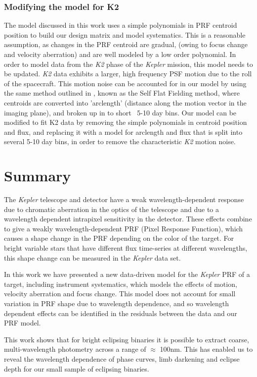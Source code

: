 \documentclass[iop]{emulateapj}
\newcommand{\kepler}{\emph{Kepler}\xspace}
\newcommand{\ktwo}{\emph{K2}\xspace}
\begin{document}
\subsubsection{Modifying the model for K2}
\label{sec:ktwo}
The model discussed in this work uses a simple polynomials in PRF centroid position to build our design matrix and model systematics. This is a reasonable assumption, as changes in the PRF centroid are gradual, (owing to focus change and velocity aberration) and are well modeled by a low order polynomial. In order to model data from the \ktwo phase of the \kepler mission, this model needs to be updated. \ktwo data exhibits a larger, high frequency PSF motion due to the roll of the spacecraft. This motion noise can be accounted for in our model by using the same method outlined in \cite{Vanderburg2014}, known as the Self Flat Fielding method, where centroids are converted into 'arclength' (distance along the motion vector in the imaging plane), and broken up in to short ~5-10 day bins. Our model can be modified to fit K2 data by removing the simple polynomials in centroid position and flux, and replacing it with a model for arclength and flux that is split into several 5-10 day bins, in order to remove the characteristic \ktwo motion noise.

\section{Summary}

The \kepler telescope and detector have a weak wavelength-dependent response due to chromatic aberration in the optics of the telescope and due to a wavelength dependent intrapixel sensitivity in the detector. These effects combine to give a weakly wavelength-dependent PRF (Pixel Response Function), which causes a shape change in the PRF depending on the color of the target. For bright variable stars that have different flux time-series at different wavelengths, this shape change can be measured in the \kepler data set.

In this work we have presented a new data-driven model for the \kepler PRF of a target, including instrument systematics, which models the effects of motion, velocity aberration and focus change. This model does not account for small variation in PRF shape due to wavelength dependence, and so wavelength dependent effects can be identified in the residuals between the data and our PRF model.

This work shows that for bright eclipsing binaries it is possible to extract coarse, multi-wavelength photometry across a range of $\approx$ 100nm. This has enabled us to reveal the wavelength dependence of phase curves, limb darkening and eclipse depth for our small sample of eclipsing binaries.
\end{document}
